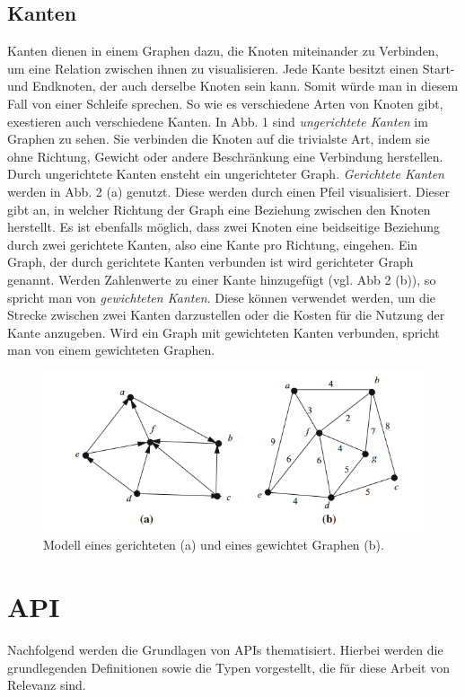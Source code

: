 \subsection{Kanten} %
\label{sec:kanten}
Kanten dienen in einem Graphen dazu, die Knoten miteinander zu Verbinden, um eine Relation zwischen ihnen zu visualisieren. Jede Kante besitzt einen Start- und Endknoten, der auch derselbe Knoten sein kann. Somit würde man in diesem Fall von einer Schleife sprechen. So wie es verschiedene Arten von Knoten gibt, exestieren auch verschiedene Kanten. 
In Abb. 1 sind \textit{ungerichtete Kanten} im Graphen zu sehen. Sie verbinden die Knoten auf die trivialste Art, indem sie ohne Richtung, Gewicht oder andere Beschränkung eine Verbindung herstellen. Durch ungerichtete Kanten ensteht ein ungerichteter Graph.
\textit{Gerichtete Kanten} werden in Abb. 2 (a) genutzt. Diese werden durch einen Pfeil visualisiert. Dieser gibt an, in welcher Richtung der Graph eine Beziehung zwischen den Knoten herstellt. Es ist ebenfalls möglich, dass zwei Knoten eine beidseitige Beziehung durch zwei gerichtete Kanten, also eine Kante pro Richtung, eingehen. Ein Graph, der durch gerichtete Kanten verbunden ist wird gerichteter Graph genannt.
Werden Zahlenwerte zu einer Kante hinzugefügt (vgl. Abb 2 (b)), so spricht man von \textit{gewichteten Kanten}. Diese können verwendet werden, um die Strecke zwischen zwei Kanten darzustellen oder die Kosten für die Nutzung der Kante anzugeben. Wird ein Graph mit gewichteten Kanten verbunden, spricht man von einem gewichteten Graphen.\citep{graphTheory}
\begin{figure}[H]
	\centering
	\includegraphics[scale=1]{Illustrations/graph_01.png}
	\caption{Modell eines gerichteten (a) und eines gewichtet Graphen (b). \citep{graphTheory}}
\end{figure}

\section{API} %
\label{sec:apigrundlagen}
Nachfolgend werden die Grundlagen von APIs thematisiert. Hierbei werden die grundlegenden Definitionen sowie die Typen vorgestellt, die für diese Arbeit von Relevanz sind.
